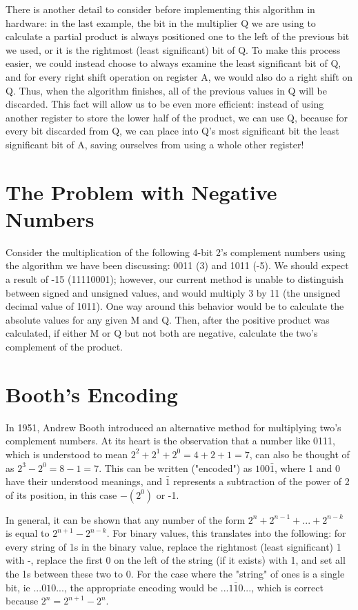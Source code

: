 \documentclass{article}
\begin{document}
There is another detail to consider before implementing this algorithm in hardware: in the last example, the bit in the multiplier Q we are using to calculate a partial product is always positioned one to the left of the previous bit we used, or it is the rightmost (least significant) bit of Q.
To make this process easier, we could instead choose to always examine the least significant bit of Q, and for every right shift operation on register A, we would also do a right shift on Q.
Thus, when the algorithm finishes, all of the previous values in Q will be discarded.
This fact will allow us to be even more efficient: instead of using another register to store the lower half of the product, we can use Q, because for every bit discarded from Q, we can place into Q's most significant bit the least significant bit of A, saving ourselves from using a whole other register!


\section{The Problem with Negative Numbers}
Consider the multiplication of the following 4-bit 2's complement numbers using the algorithm we have been discussing: 0011 (3) and 1011 (-5).
We should expect a result of -15 (11110001); however, our current method is unable to distinguish between signed and unsigned values, and would multiply 3 by 11 (the unsigned decimal value of 1011).
One way around this behavior would be to calculate the absolute values for any given M and Q.
Then, after the positive product was calculated, if either M or Q but not both are negative, calculate the two's complement of the product.

\section{Booth's Encoding}
In 1951, Andrew Booth introduced an alternative method for multiplying two's complement numbers.
At its heart is the observation that a number like 0111, which is understood to mean $2^2 + 2^1 + 2^0 = 4 + 2 + 1 = 7$, can also be thought of as $2^3 - 2^0 = 8 - 1 = 7$.
This can be written ("encoded") as $100\bar{1}$, where 1 and 0 have their understood meanings, and $\bar{1}$ represents a subtraction of the power of 2 of its position, in this case $-(2^0)$ or -1.

    In general, it can be shown that any number of the form $2^n + 2^{n-1} + ...
+ 2^{n-k}$ is equal to $2^{n+1} - 2^{n-k}$.
For binary values, this translates into the following: for every string of 1s in the binary value, replace the rightmost (least significant) 1 with -, replace the first 0 on the left of the string (if it exists) with 1, and set all the 1s between these two to 0.
For the case where the "string" of ones is a single bit, ie $...010...$,
the appropriate encoding would be $...1\bar{1}0...$,
which is correct because $2^n = 2^{n+1} - 2^n$.
\end{document}
